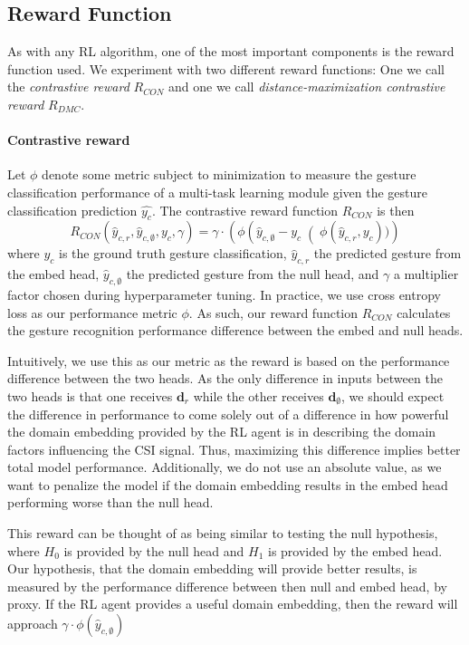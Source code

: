 \subsection{Reward Function}\label{subsec:methodology-reward}

As with any RL algorithm, one of the most important components is the reward function used.
We experiment with two different reward functions: One we call the \textit{contrastive reward} $R_{CON}$ and one we call \textit{distance-maximization contrastive reward} $R_{DMC}$.

\paragraph{Contrastive reward}
Let $\phi$ denote some metric subject to minimization to measure the gesture classification performance of a multi-task learning module given the gesture classification prediction $\hat{y_{c}}$.
The contrastive reward function $R_{CON}$ is then 
\begin{equation}
	R_{CON}(\hat{y}_{c,r}, \hat{y}_{c,\emptyset}, y_c, \gamma) = \gamma \cdot \left(\phi\left(\hat{y}_{c,\emptyset} - y_c\right(\phi\left(\hat{y}_{c,r}, y_c\right))\right)
\end{equation}
where $y_c$ is the ground truth gesture classification, $\hat{y}_{c,r} $ the predicted gesture from the embed head, $\hat{y}_{c,\emptyset}$ the predicted gesture from the null head, and $\gamma$ a multiplier factor chosen during hyperparameter tuning.
In practice, we use cross entropy loss as our performance metric $\phi$.
As such, our reward function $R_{CON}$ calculates the gesture recognition performance difference between the embed and null heads.

Intuitively, we use this as our metric as the reward is based on the performance difference between the two heads.
As the only difference in inputs between the two heads is that one receives $\boldsymbol{d}_r$ while the other receives $\boldsymbol{d}_\emptyset$, we should expect the difference in performance to come solely out of a difference in how powerful the domain embedding provided by the RL agent is in describing the domain factors influencing the CSI signal.
Thus, maximizing this difference implies better total model performance.
Additionally, we do not use an absolute value, as we want to penalize the model if the domain embedding results in the embed head performing worse than the null head.

This reward can be thought of as being similar to testing the null hypothesis, where $H_0$ is provided by the null head and $H_1$ is provided by the embed head.
Our hypothesis, that the domain embedding will provide better results, is measured by the performance difference between then null and embed head, by proxy.
If the RL agent provides a useful domain embedding, then the reward will approach $\gamma \cdot \phi\left(\hat{y}_{c,\emptyset}\right)$

